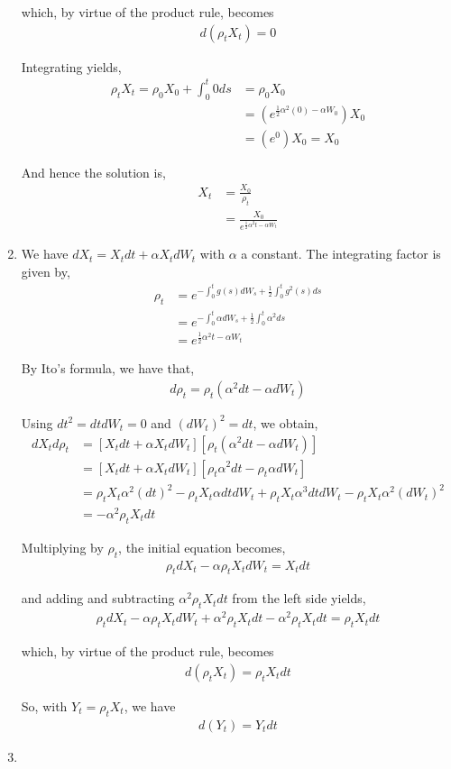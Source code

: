 \documentclass[12pt]{article}
\begin{document}
\begin{enumerate}[\alph*)]
which, by virtue of the product rule, becomes
\begin{align*}
d(\rho_tX_t) = 0
\end{align*}

Integrating yields,
\begin{align*}
\rho_tX_t = \rho_0X_0 + \int_0^t 0 ds &= \rho_0X_0\\
&= (e^{\frac{1}{2} \alpha^2(0) - \alpha W_0})X_0\\
&= (e^0)X_0 = X_0
\end{align*}

And hence the solution is,
\begin{align*}
X_t &= \frac{X_0}{\rho_t}\\
&= \frac{X_0}{e^{\frac{1}{2} \alpha^2t - \alpha W_t}}
\end{align*}

\item We have $dX_t = X_t dt + \alpha X_t dW_t$ with $\alpha$ a constant. The integrating factor is given by,
\begin{align*}
\rho_t &= e^{-\int_0^t g(s) dW_s + \frac{1}{2}\int_0^t g^2(s) ds}\\
&= e^{-\int_0^t \alpha dW_s + \frac{1}{2}\int_0^t \alpha^2 ds}\\
&= e^{\frac{1}{2} \alpha^2t - \alpha W_t}
\end{align*}

By Ito's formula, we have that,
\begin{align*}
d\rho_t = \rho_t(\alpha^2 dt - \alpha dW_t)
\end{align*}

Using $dt^2 = dt dW_t = 0$ and $(dW_t)^2 = dt$, we obtain,
\begin{align*}
dX_td\rho_t &= [X_tdt + \alpha X_t dW_t][\rho_t(\alpha^2 dt - \alpha dW_t)]\\
&= [X_tdt + \alpha X_t dW_t][\rho_t \alpha^2 dt - \rho_t \alpha dW_t]\\
&=  \rho_t X_t \alpha^2 (dt)^2 - \rho_t X_t \alpha dt dW_t + \rho_t X_t \alpha^3 dt dW_t - \rho_t X_t \alpha^2 (dW_t)^2\\
&= - \alpha^2 \rho_t X_t dt
\end{align*}

Multiplying by $\rho_t$, the initial equation becomes,
\begin{align*}
\rho_tdX_t - \alpha\rho_tX_tdW_t = X_t dt
\end{align*}

and adding and subtracting $\alpha^2\rho_tX_tdt$ from the left side yields,
\begin{align*}
\rho_tdX_t - \alpha\rho_tX_tdW_t + \alpha^2\rho_tX_tdt - \alpha^2\rho_tX_tdt = \rho_tX_t dt
\end{align*}

which, by virtue of the product rule, becomes
\begin{align*}
d(\rho_tX_t) = \rho_t X_t dt
\end{align*}

So, with $Y_t = \rho_tX_t$, we have
\begin{align*}
d(Y_t) = Y_t dt
\end{align*}

\item

\end{enumerate}
\end{document}
